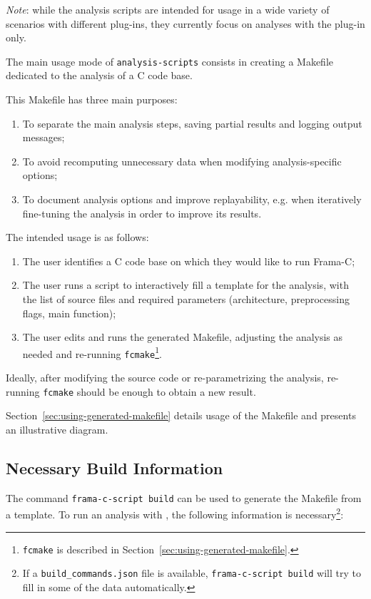 {\em Note}: while the analysis scripts are intended for usage in a wide variety
of scenarios with different plug-ins, they currently focus
on analyses with the \Value plug-in only.

The main usage mode of \texttt{analysis-scripts} consists in creating a
Makefile dedicated to the analysis of a C code base.

This Makefile has three main purposes:

\begin{enumerate}
\item To separate the main analysis steps, saving partial results and logging
  output messages;
\item To avoid recomputing unnecessary data when modifying
  analysis-specific options;
\item To document analysis options and improve replayability, e.g. when
  iteratively fine-tuning the analysis in order to improve its results.
\end{enumerate}

The intended usage is as follows:

\begin{enumerate}
\item The user identifies a C code base on which they would like to run
  Frama-C;
\item The user runs a script to interactively fill a template for
  the analysis, with the list of source files and required parameters
  (architecture, preprocessing flags, main function);
\item The user edits and runs the generated Makefile, adjusting the
  analysis as needed and re-running \texttt{fcmake}\footnote{\texttt{fcmake}
  is described in Section~\ref{sec:using-generated-makefile}.}.
\end{enumerate}

Ideally, after modifying the source code or re-parametrizing the analysis,
re-running \texttt{fcmake} should be enough to obtain a new result.

Section~\ref{sec:using-generated-makefile} details usage of the Makefile
and presents an illustrative diagram.

\subsection{Necessary Build Information}
\label{sec:necessary-build-information}

The command \texttt{frama-c-script build} can be used to generate the
Makefile from a template. To run an analysis with \Value, the following
information is necessary\footnote{If a \texttt{build\_commands.json} file is
available, \texttt{frama-c-script build} will try to fill in some of the data
automatically.}:

